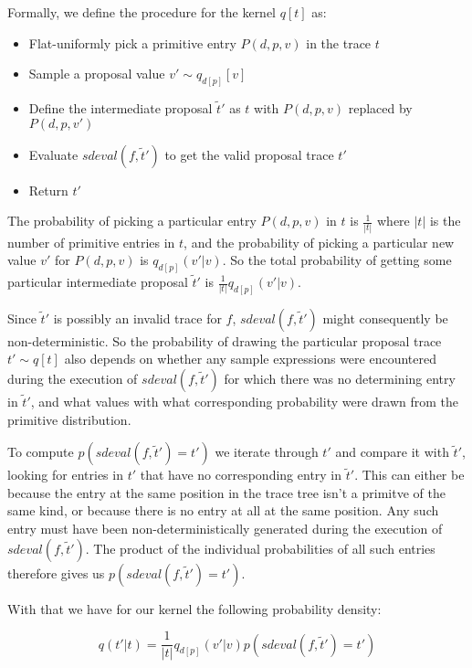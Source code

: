 Formally, we define the procedure for the kernel $q[t]$ as:

\begin{minipage}{\linewidth}
\begin{itemize}
\item Flat-uniformly pick a primitive entry $P(d,p,v)$ in the trace $t$
\item Sample a proposal value $v' \sim q_{d[p]}[v]$
\item Define the intermediate proposal $\tilde{t}'$ as $t$ with $P(d,p,v)$ replaced by $P(d,p,v')$
\item Evaluate $sdeval(f,\tilde{t}')$ to get the valid proposal trace $t'$
\item Return $t'$
\end{itemize}
\end{minipage}

The probability of picking a particular entry $P(d,p,v)$ in $t$ is $\frac{1}{|t|}$ where $|t|$ is the number of primitive entries in $t$, and the probability of picking a particular new value $v'$ for $P(d,p,v)$ is $q_{d[p]}(v' | v)$. So the total probability of getting some particular intermediate proposal $\tilde{t}'$ is $\frac{1}{|t|} q_{d[p]}(v' | v)$.

Since $\tilde{t}'$ is possibly an invalid trace for $f$, $sdeval(f,\tilde{t}')$ might consequently be non-deterministic. So the probability of drawing the particular proposal trace $t' \sim q[t]$ also depends on whether any sample expressions were encountered during the execution of $sdeval(f, \tilde{t}')$ for which there was no determining entry in $\tilde{t}'$, and what values with what corresponding probability were drawn from the primitive distribution.

To compute $p(sdeval(f,\tilde{t}') = t')$ we iterate through $t'$ and compare it with $\tilde{t}'$, looking for entries in $t'$ that have no corresponding entry in $\tilde{t}'$. This can either be because the entry at the same position in the trace tree isn't a primitve of the same kind, or because there is no entry at all at the same position. Any such entry must have been non-deterministically generated during the execution of $sdeval(f,\tilde{t}')$. The product of the individual probabilities of all such entries therefore gives us $p(sdeval(f,\tilde{t}') = t')$.

With that we have for our kernel the following probability density:

\begin{equation*}
     q(t' | t) = \frac{1}{|t|} q_{d[p]}(v' | v) p(sdeval(f,\tilde{t}') = t')
\end{equation*}

